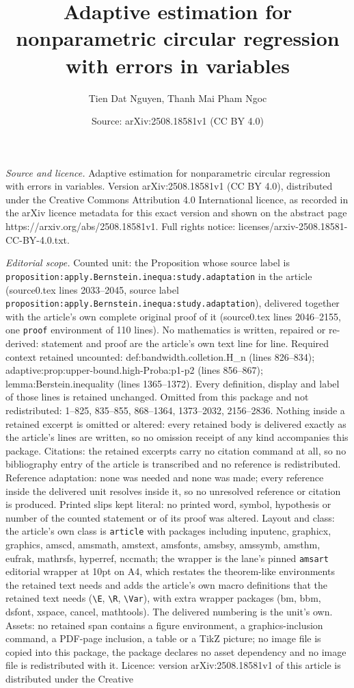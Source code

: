 \documentclass[10pt,a4paper]{amsart}
\title[Adaptive estimation for nonparametric circular regression wi]{Adaptive estimation for nonparametric circular regression with errors in variables}
\author{Tien Dat Nguyen, Thanh Mai Pham Ngoc}
\date{Source: arXiv:2508.18581v1 (CC BY 4.0)}
\begin{document}
\maketitle

\noindent\emph{Source and licence.} Adaptive estimation for nonparametric circular regression with errors in variables. Version arXiv:2508.18581v1 (CC BY 4.0), distributed under the Creative Commons Attribution 4.0 International licence, as recorded in the arXiv licence metadata for this exact version and shown on the abstract page https://arxiv.org/abs/2508.18581v1. Full rights notice: licenses/arxiv-2508.18581-CC-BY-4.0.txt.\par\smallskip

\noindent\textit{Editorial scope.} Counted unit: the Proposition whose source label is \texttt{proposition:apply.Bernstein.inequa:study.adaptation} in the article (source0.tex lines 2033--2045, source label \texttt{proposition:apply.Bernstein.inequa:study.adaptation}), delivered together with the article's own complete original proof of it (source0.tex lines 2046--2155, one \texttt{proof} environment of 110 lines). No mathematics is written, repaired or re-derived: statement and proof are the article's own text line for line. Required context retained uncounted: def:bandwidth.colletion.H\_n (lines 826--834); adaptive:prop:upper-bound.high-Proba:p1-p2 (lines 856--867); lemma:Berstein.inequality (lines 1365--1372). Every definition, display and label of those lines is retained unchanged. Omitted from this package and not redistributed: 1--825, 835--855, 868--1364, 1373--2032, 2156--2836. Nothing inside a retained excerpt is omitted or altered: every retained body is delivered exactly as the article's lines are written, so no omission receipt of any kind accompanies this package. Citations: the retained excerpts carry no citation command at all, so no bibliography entry of the article is transcribed and no reference is redistributed. Reference adaptation: none was needed and none was made; every reference inside the delivered unit resolves inside it, so no unresolved reference or citation is produced. Printed slips kept literal: no printed word, symbol, hypothesis or number of the counted statement or of its proof was altered. Layout and class: the article's own class is \texttt{article} with packages including inputenc, graphicx, graphics, amscd, amsmath, amstext, amsfonts, amsbsy, amssymb, amsthm, eufrak, mathrsfs, hyperref, nccmath; the wrapper is the lane's pinned \texttt{amsart} editorial wrapper at 10pt on A4, which restates the theorem-like environments the retained text needs and adds the article's own macro definitions that the retained text needs (\texttt{\textbackslash E}, \texttt{\textbackslash R}, \texttt{\textbackslash Var}), with extra wrapper packages (bm, bbm, dsfont, xspace, cancel, mathtools). The delivered numbering is the unit's own. Assets: no retained span contains a figure environment, a graphics-inclusion command, a PDF-page inclusion, a table or a TikZ picture; no image file is copied into this package, the package declares no asset dependency and no image file is redistributed with it. Licence: version arXiv:2508.18581v1 of this article is distributed under the Creative 
\end{document}
